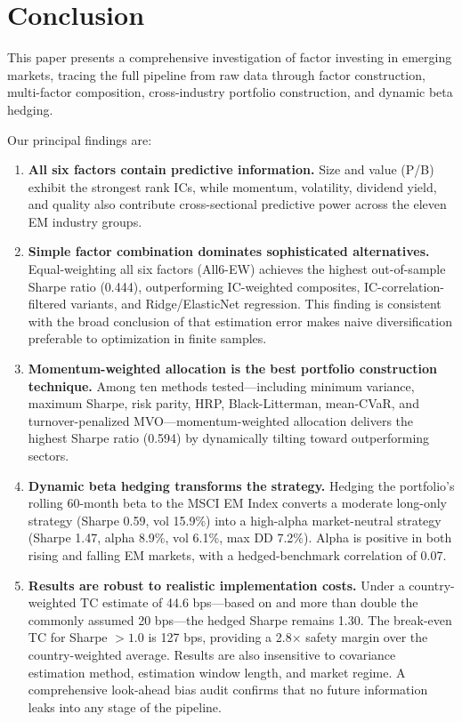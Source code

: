 \documentclass[12pt,a4paper]{article}
\begin{document}
\section{Conclusion}
\label{sec:conclusion}

This paper presents a comprehensive investigation of factor investing in emerging markets, tracing the full pipeline from raw data through factor construction, multi-factor composition, cross-industry portfolio construction, and dynamic beta hedging.

Our principal findings are:

\begin{enumerate}
    \item \textbf{All six factors contain predictive information.} Size and value (P/B) exhibit the strongest rank ICs, while momentum, volatility, dividend yield, and quality also contribute cross-sectional predictive power across the eleven EM industry groups.

    \item \textbf{Simple factor combination dominates sophisticated alternatives.} Equal-weighting all six factors (All6-EW) achieves the highest out-of-sample Sharpe ratio (0.444), outperforming IC-weighted composites, IC-correlation-filtered variants, and Ridge/ElasticNet regression. This finding is consistent with the broad conclusion of \citet{demiguel2009} that estimation error makes naive diversification preferable to optimization in finite samples.

    \item \textbf{Momentum-weighted allocation is the best portfolio construction technique.} Among ten methods tested---including minimum variance, maximum Sharpe, risk parity, HRP, Black-Litterman, mean-CVaR, and turnover-penalized MVO---momentum-weighted allocation delivers the highest Sharpe ratio (0.594) by dynamically tilting toward outperforming sectors.

    \item \textbf{Dynamic beta hedging transforms the strategy.} Hedging the portfolio's rolling 60-month beta to the MSCI EM Index converts a moderate long-only strategy (Sharpe 0.59, vol 15.9\%) into a high-alpha market-neutral strategy (Sharpe 1.47, alpha 8.9\%, vol 6.1\%, max DD 7.2\%). Alpha is positive in both rising and falling EM markets, with a hedged-benchmark correlation of 0.07.

    \item \textbf{Results are robust to realistic implementation costs.} Under a country-weighted TC estimate of 44.6 bps---based on \citet{domowitz2001} and more than double the commonly assumed 20 bps---the hedged Sharpe remains 1.30. The break-even TC for Sharpe $> 1.0$ is 127 bps, providing a 2.8$\times$ safety margin over the country-weighted average. Results are also insensitive to covariance estimation method, estimation window length, and market regime. A comprehensive look-ahead bias audit confirms that no future information leaks into any stage of the pipeline.
\end{enumerate}
\end{document}
